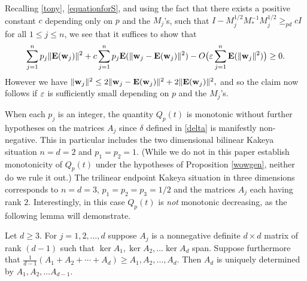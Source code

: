 Recalling \eqref{tony}, \eqref{equationforS}, and using the fact that there exists a positive
constant $c$ depending only on $p$ and the $M_j$'s, such that
$I-M_j^{1/2}M_{*}^{-1}M_{j}^{1/2} \geq_{pd} c I$
for all $1\leq j\leq n$, we see that it suffices to show that
$$
\sum_{j=1}^n p_{j}\|{\hbox{\bf E}}( {\hbox{\bf w}}_j)\|^2  + c\sum_{j=1}^n p_{j}{\hbox{\bf E}}( \|
{\hbox{\bf w}}_j - {\hbox{\bf E}}({\hbox{\bf w}}_j) \|^2 ) - O\bigl(\varepsilon \sum_{j=1}^n {\hbox{\bf E}}( \|{\hbox{\bf w}}_j\|^2
)\bigr) \geq 0.
$$
However we have
$\| {\hbox{\bf w}}_j \|^2 \leq 2\| {\hbox{\bf w}}_j - {\hbox{\bf E}}({\hbox{\bf w}}_j) \|^2 + 2\| {\hbox{\bf E}}({\hbox{\bf w}}_j) \|^2,$
and so the claim now follows if $\varepsilon$ is sufficiently small
depending on $p$ and the $M_j$'s.


\vspace{2mm}

When each $p_j$ is an integer, the quantity $Q_p (t)$ is monotonic
without further hypotheses on the matrices $A_j$ since $\delta$ defined
in \eqref{delta} is manifestly non-negative. This in particular includes
the two dimensional bilinear Kakeya situation $n=d=2$ and $p_1=p_2=1$.
(While we do not in this paper establish monotonicity of $Q_{p}(t)$ under
the hypotheses of Proposition \ref{wowgen}, neither do we rule it out.)
The trilinear endpoint Kakeya situation in three dimensions corresponds
to $n=d=3$, $p_1=p_2=p_3 =1/2$ and the matrices $A_j$ each having rank
$2$. Interestingly, in this case $Q_{p}(t)$ is \emph{not} monotonic
decreasing, as the following lemma will demonstrate.
\begin{lemma}\label{notmonlemma}
Let $d \geq 3$. For $j = 1,2, \hdots, d$ suppose $A_j$ is a nonnegative
definite $d \times d$ matrix of rank $(d-1)$ such that $\ker A_1, \ker A_2,
\hdots \ker A_d$ span. Suppose furthermore that $\tfrac{1}{d-1}(A_1+A_2+
\cdots + A_d)\geq A_1,A_2, \hdots ,A_d$. Then $A_d$ is uniquely determined
by $A_1, A_2, \dots A_{d-1}$.
\end{lemma}
